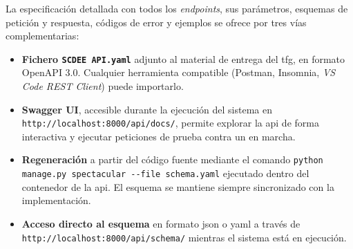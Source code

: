 La especificación detallada con todos los \textit{endpoints}, sus
parámetros, esquemas de petición y respuesta, códigos de error y
ejemplos se ofrece por tres vías complementarias:

\begin{itemize}

  \item \textbf{Fichero \texttt{SCDEE API.yaml}} adjunto al material de
  entrega del \acs{tfg}, en formato OpenAPI 3.0. Cualquier herramienta
  compatible (Postman, Insomnia, \textit{VS Code REST Client}) puede
  importarlo.

  \item \textbf{Swagger UI}, accesible durante la ejecución del sistema
  en \texttt{http://localhost:8000/api/docs/}, permite explorar la
  \acs{api} de forma interactiva y ejecutar peticiones de prueba contra
  un  en marcha.

  \item \textbf{Regeneración} a partir del código fuente mediante el
  comando \texttt{python manage.py spectacular -{}-file schema.yaml}
  ejecutado dentro del contenedor de la \acs{api}. El esquema se
  mantiene siempre sincronizado con la implementación.

  \item \textbf{Acceso directo al esquema} en formato \acs{json} o
  \acs{yaml} a través de \texttt{http://localhost:8000/api/schema/}
  mientras el sistema está en ejecución.

\end{itemize}
